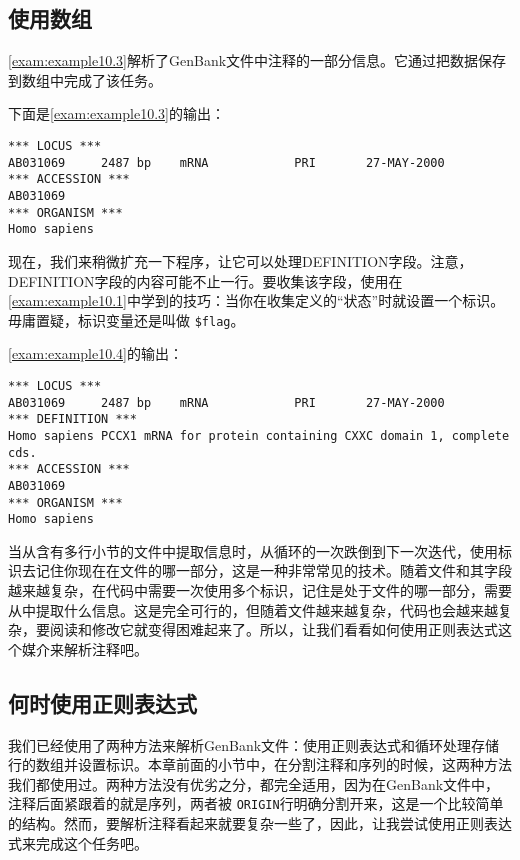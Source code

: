 \subsection{使用数组}
\autoref{exam:example10.3}解析了GenBank文件中注释的一部分信息。它通过把数据保存到数组中完成了该任务。
  


下面是\autoref{exam:example10.3}的输出：

\begin{lstlisting}
*** LOCUS ***
AB031069     2487 bp    mRNA            PRI       27-MAY-2000
*** ACCESSION ***
AB031069
*** ORGANISM ***
Homo sapiens
\end{lstlisting}

现在，我们来稍微扩充一下程序，让它可以处理DEFINITION字段。注意，DEFINITION字段的内容可能不止一行。要收集该字段，使用在\autoref{exam:example10.1}中学到的技巧：当你在收集定义的“状态”时就设置一个标识。毋庸置疑，标识变量还是叫做 \verb|$flag|。



\autoref{exam:example10.4}的输出：

\begin{lstlisting}
*** LOCUS ***
AB031069     2487 bp    mRNA            PRI       27-MAY-2000
*** DEFINITION ***
Homo sapiens PCCX1 mRNA for protein containing CXXC domain 1, complete
cds.
*** ACCESSION ***
AB031069
*** ORGANISM ***
Homo sapiens
\end{lstlisting}

当从含有多行小节的文件中提取信息时，从循环的一次跌倒到下一次迭代，使用标识去记住你现在在文件的哪一部分，这是一种非常常见的技术。随着文件和其字段越来越复杂，在代码中需要一次使用多个标识，记住是处于文件的哪一部分，需要从中提取什么信息。这是完全可行的，但随着文件越来越复杂，代码也会越来越复杂，要阅读和修改它就变得困难起来了。所以，让我们看看如何使用正则表达式这个媒介来解析注释吧。

\subsection{何时使用正则表达式}
我们已经使用了两种方法来解析GenBank文件：使用正则表达式和循环处理存储行的数组并设置标识。本章前面的小节中，在分割注释和序列的时候，这两种方法我们都使用过。两种方法没有优劣之分，都完全适用，因为在GenBank文件中，注释后面紧跟着的就是序列，两者被 \verb|ORIGIN|行明确分割开来，这是一个比较简单的结构。然而，要解析注释看起来就要复杂一些了，因此，让我尝试使用正则表达式来完成这个任务吧。

